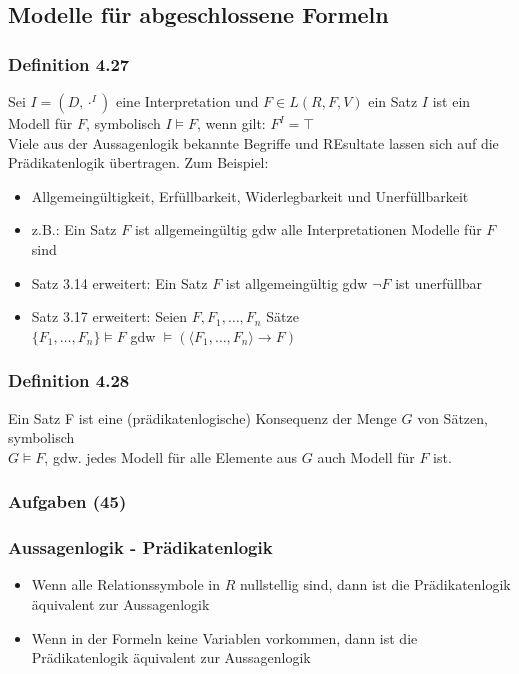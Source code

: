 \subsection{Modelle für abgeschlossene Formeln}
\subsubsection{Definition 4.27}
Sei \(I = (D,\cdot ^I)\) eine Interpretation und \(F\in L(R,F,V)\) ein Satz \(I\) ist ein Modell für \(F\), symbolisch \(I \vDash F\), wenn gilt: \(F^I = \top \) \\
Viele aus der Aussagenlogik bekannte Begriffe und REsultate lassen sich auf die Prädikatenlogik übertragen. Zum Beispiel:
\begin{itemize}
	\item Allgemeingültigkeit, Erfüllbarkeit, Widerlegbarkeit und Unerfüllbarkeit
	\item z.B.: Ein Satz \(F\) ist allgemeingültig gdw alle Interpretationen Modelle für \(F\) sind
	\item Satz 3.14 erweitert: Ein Satz \(F\) ist allgemeingültig gdw  \(\neg F\) ist unerfüllbar
	\item Satz 3.17 erweitert: Seien \(F,F_{1}, \ldots, F_{n}\) Sätze\\ \(\{F_{1}, \ldots , F_{n}\} \vDash F\) gdw \(\vDash (\langle F_{1}, \ldots, F_{n} \rangle \to F)\)
\end{itemize}
\subsubsection{Definition 4.28}
Ein Satz F ist eine (prädikatenlogische) Konsequenz der Menge \(G\) von Sätzen, symbolisch \\ \(G \vDash F\), gdw. jedes Modell für alle Elemente aus \(G\) auch Modell für \(F\) ist.
\subsubsection{Aufgaben (45)}
\subsubsection{Aussagenlogik - Prädikatenlogik}
\begin{itemize}
	\item Wenn alle Relationssymbole in \(R\) nullstellig sind, dann ist die Prädikatenlogik äquivalent zur Aussagenlogik
	\item Wenn in der Formeln keine Variablen vorkommen, dann ist die Prädikatenlogik äquivalent zur Aussagenlogik
\end{itemize}
